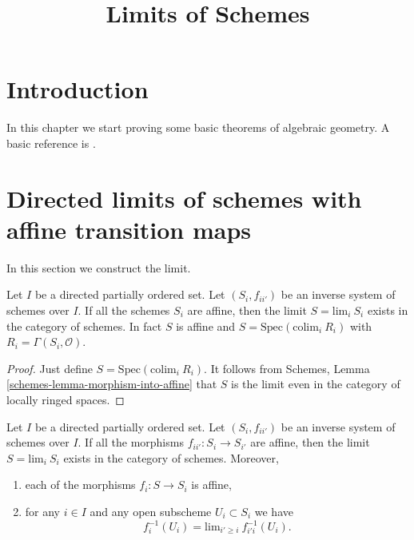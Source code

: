 

%


\title{Limits of Schemes}


\maketitle

\label{section-phantom}

\tableofcontents

\section{Introduction}
\label{section-introduction}

\noindent
In this chapter we start proving some basic theorems of algebraic geometry.
A basic reference is \cite{EGA}.




\section{Directed limits of schemes with affine transition maps}
\label{section-limits}

\noindent
In this section we construct the limit.

\begin{lemma}
\label{lemma-directed-inverse-system-affine-schemes-has-limit}
Let $I$ be a directed partially ordered set.
Let $(S_i, f_{ii'})$ be an inverse system of
schemes over $I$.  If all the schemes $S_i$
are affine, then the limit $S = \text{lim}_i\ S_i$ exists
in the category of schemes.
In fact $S$ is affine and $S = \text{Spec}(\text{colim}_i\ R_i)$
with $R_i = \Gamma(S_i, \mathcal{O})$.
\end{lemma}

\begin{proof}
Just define $S = \text{Spec}(\text{colim}_i\ R_i)$.
It follows from Schemes, Lemma \ref{schemes-lemma-morphism-into-affine}
that $S$ is the limit even in the category of locally ringed spaces.
\end{proof}

\begin{lemma}
\label{lemma-directed-inverse-system-has-limit}
Let $I$ be a directed partially ordered set.
Let $(S_i, f_{ii'})$ be an inverse system of
schemes over $I$. If all the morphisms $f_{ii'} : S_i \to S_{i'}$
are affine, then the limit $S = \text{lim}_i\ S_i$ exists
in the category of schemes.
Moreover,
\begin{enumerate}
\item each of the morphisms $f_i : S \to S_i$ is affine,
\item for any $i \in I$ and any open subscheme $U_i \subset S_i$
we have
$$
f_i^{-1}(U_i) = \text{lim}_{i' \geq i}\ f_{i'i}^{-1}(U_i).
$$
\end{enumerate}
\end{lemma}

